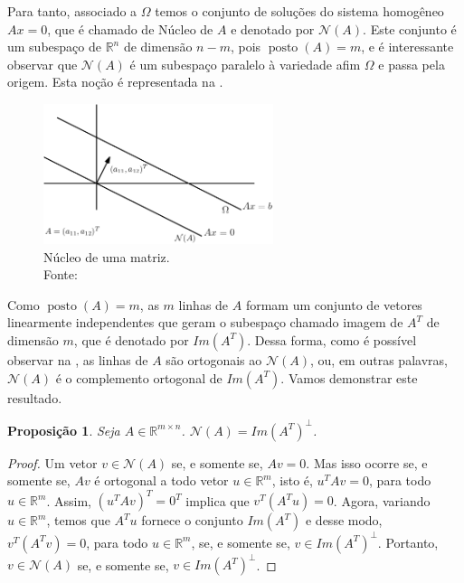\documentclass[12pt,a4paper]{scrartcl}
\DeclareMathOperator{\posto}{posto}
\def\RR{\mathds{R}}
\newtheorem{prop}{Proposição}
\theoremstyle{definition}%
\begin{document}
Para tanto, associado a $\Omega$ temos o conjunto de soluções do sistema homogêneo $Ax=0$, que é chamado de Núcleo de $A$ e denotado por $\mathcal{N}(A)$. Este conjunto é um subespaço de $\RR^{n}$ de dimensão $n-m$, pois $\posto (A)=m$, e é interessante observar que $\mathcal{N}(A)$ é um subespaço paralelo à variedade afim $\Omega$ e passa pela origem. Esta noção é representada na .

\begin{figure}[!ht] 
	\centering
	\includegraphics[width=0.60\textwidth]{nucleoA_paralelo_Omega}
	\caption{ Núcleo de uma matriz. \\ Fonte: \textcite{Ana1994} \label{fig:nucleoA_paralelo_Omega}}
\end{figure}


Como $\posto (A)=m$, as $m$ linhas de $A$ formam um conjunto de vetores linearmente independentes que geram o subespaço chamado imagem de $A^{T}$ de dimensão $m$, que é denotado por $Im(A^{T})$. Dessa forma, como é possível observar na , as linhas de $A$ são ortogonais ao $\mathcal{N}(A)$, ou, em outras palavras, $\mathcal{N}(A)$ é o complemento ortogonal de $Im(A^{T})$. Vamos demonstrar este resultado. 

\begin{prop} \label{prop:complemento_ortogonal_nucleo}
Seja $A \in \RR^{m\times n}$. $\mathcal{N}(A) = Im(A^{T})^{\bot}$.
\end{prop}
\begin{proof}
Um vetor $v \in \mathcal{N}(A)$ se, e somente se, $Av=0$. Mas isso ocorre se, e somente se, $Av$ é ortogonal a todo vetor $u\in \RR^{m}$, isto é, $u^{T}Av=0$, para todo $u \in \RR^{m}$. Assim, $(u^{T}Av)^{T} = 0^{T}$ implica que $v^{T}(A^{T}u) = 0$. Agora, variando $u \in \RR^{m}$, temos que $A^{T}u$ fornece o conjunto $Im(A^{T})$ e desse modo, $v^{T}(A^{T}v) = 0$, para todo $u \in \RR^{m}$, se, e somente se, $v \in Im(A^{T})^{\bot}$. Portanto, $v\in \mathcal{N}(A)$ se, e somente se, $v\in Im(A^{T})^{\bot}$.
\end{proof}
\end{document}
